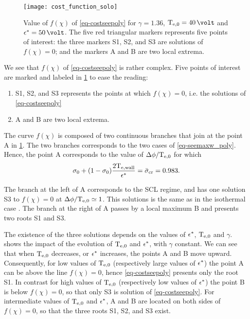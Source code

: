 \begin{figure}[!hbt]
  \centering
  \texttt{[image: cost\_function\_solo]}
  \caption{Value of $f(\chi)$ of \cref{eq-costseepoly} for $\gamma = 1.36$, $\Teb=40\,\volt$ and $\crover=50\,\volt$. The five red triangular markers represents five points of interest\string: the three markers S1, S2, and S3 are solutions of $f(\chi) = 0$; and the markers A and B are two local extrema. }
  \label{fig-costfunction}
\end{figure}

We see that $f(\chi)$ of \cref{eq-costseepoly} is rather complex.
Five points of interest are marked and labeled in \cref{fig-costfunction} to ease the reading\string: 
\begin{enumerate}
  \item S1, S2, and S3 represents the points at which $f(\chi)=0$, i.e. the solutions of  \cref{eq-costseepoly}
  \item A and B are two local extrema.
\end{enumerate}

The curve $f(\chi)$ is composed of two continuous branches that join at the point A in \cref{fig-costfunction}.
The two branches corresponds to the two cases of \cref{eq-seemaxw_poly}. Hence, the point A corresponds to the value of $\Delta \phi/\mathrm{T_{e, 0}}$ for which  \[ \sigma_0 + ( 1 - \sigma_0) \frac{ 2 \mathrm{T_{e, wall}}  }{\epsilon^{*}} =  \bar{\sigma }_{\rm cr} = 0.983. \]

The branch at the left of A corresponds to the \ac{SCL} regime, and has one solution S3 to $f(\chi)=0$ at $\Delta \phi / \mathrm{T_{e, 0}} \simeq 1$.
This solutions is the same as in the isothermal case \citep{hobbs1967}.
The branch at the right of A passes by a local maximum B and presents two roots S1 and S3.

The existence of the three solutions depends on the values of $\epsilon^{*}$, $\mathrm{T_{e, 0}}$ and $\gamma$.
 shows the impact of the evolution of $\mathrm{T_{e, 0}}$ and $\epsilon^{*}$, with $\gamma$ constant.
We can see that when $\mathrm{T_{e, 0}}$ decreases, or $\epsilon^{*}$ increases, the points A and B move upward.
Consequently, for low values of $\mathrm{T_{e, 0}}$ (respectively large values of $\epsilon^{*}$) the point A can be above the line $f(\chi) = 0$, hence  \cref{eq-costseepoly} presents only the root S1.
In contrast for high values of $\mathrm{T_{e, 0}}$ (respectively low values of $\epsilon^{*}$) the point B is below $f(\chi) = 0$, so that only S3 is solution of  \cref{eq-costseepoly}.
For intermediate values of $\mathrm{T_{e, 0}}$ and $\epsilon^{*}$, A and B are located on both sides of $f(\chi) = 0$, so that the three roots S1, S2, and S3 exist.
\renewcommand\subfigurewidth{0.47\textwidth}

